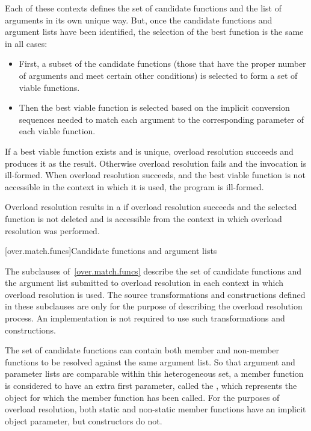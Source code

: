Each of these contexts defines the set of candidate functions and
the list of arguments in its own unique way.
But, once the
candidate functions and argument lists have been identified, the
selection of the best function is the same in all cases:

\begin{itemize}
\item
First, a subset of the candidate functions (those that have
the proper number of arguments and meet certain other
conditions) is selected to form a set of
%
viable functions.
\item
Then the best viable function is selected based on the
implicit conversion sequences needed to
match each argument to the corresponding parameter of each
viable function.
\end{itemize}

\pnum
If a best viable function exists and is unique, overload
resolution succeeds and produces it as the result.
Otherwise
overload resolution fails and the invocation is ill-formed.
When overload resolution succeeds,
and the best viable function is not accessible in the context
in which it is used,
the program is ill-formed.

\pnum
Overload resolution results in a 
if overload resolution succeeds and
the selected function is not deleted and
is accessible from the context in which overload resolution was performed.

[over.match.funcs]{Candidate functions and argument lists}%
%

\pnum
The subclauses of~\ref{over.match.funcs} describe
the set of candidate functions and the argument list submitted to
overload resolution in each context in which
overload resolution is used.
The source transformations and constructions defined
in these subclauses are only for the purpose of describing the
overload resolution process.
An implementation is not required
to use such transformations and constructions.

\pnum
{}%
%
The set of candidate functions can contain both member and non-member
functions to be resolved against the same argument list.
So that argument and parameter lists are comparable within this
heterogeneous set, a member function is considered to have an
extra first parameter, called the
,
which represents the object for which the member function has been
called.
For the purposes of overload resolution, both static and
non-static member functions have an implicit object parameter,
but constructors do not.

